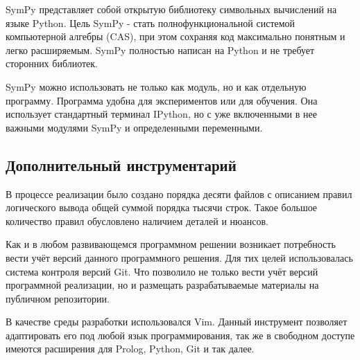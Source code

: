 	SymPy представляет собой открытую библиотеку символьных вычислений на языке Python. Цель SymPy - стать полнофункциональной системой компьютерной алгебры (CAS), при этом сохраняя код максимально понятным и легко расширяемым. SymPy полностью написан на Python и не требует сторонних библиотек.

	SymPy можно использовать не только как модуль, но и как отдельную программу. Программа удобна для экспериментов или для обучения. Она использует стандартный терминал IPython, но с уже включенными в нее важными модулями SymPy и определенными переменными.

	\subsection{Дополнительный инструментарий}

		В процессе реализации было создано порядка десяти файлов с описанием правил логического вывода
			общей суммой порядка тысячи строк. Такое большое количество правил обусловлено наличием деталей и нюансов.

		Как и в любом развивающемся программном решении возникает потребность вести учёт версий данного
			программного решения. Для тих целей использовалась система контроля версий Git.
			Что позволило не только вести учёт версий программной реализации,
			но и размещать разрабатываемые материалы на публичном репозитории.

		В качестве среды разработки использовался Vim. Данный инструмент позволяет адаптировать его
			под любой язык программирования, так же в свободном доступе имеются расширения для Prolog,
			Python, Git и так далее.
